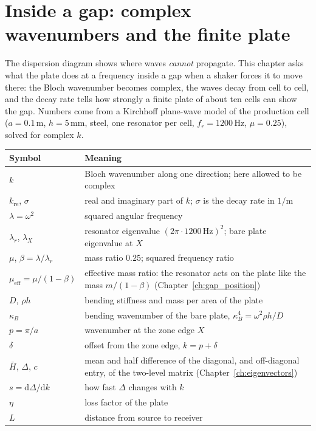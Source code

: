 
\chapter{Inside a gap: complex wavenumbers and the finite plate}
\label{ch:complex_k}

The dispersion diagram shows where waves \emph{cannot} propagate. This chapter asks
what the plate does at a frequency inside a gap when a shaker forces it to move
there: the Bloch wavenumber becomes complex, the waves decay from cell to cell, and
the decay rate tells how strongly a finite plate of about ten cells can show the
gap. Numbers come from a Kirchhoff plane-wave model of the production cell
($a = 0.1\,\mathrm{m}$, $h = 5\,\mathrm{mm}$, steel, one resonator per cell,
$f_r = 1200\,\mathrm{Hz}$, $\mu = 0.25$), solved for complex $k$.

\begin{center}
\begin{tabular}{|l|p{}|}
\hline
Symbol & Meaning \\
\hline
$k$ & Bloch wavenumber along one direction; here allowed to be complex \\
$k_\mathrm{re}$, $\sigma$ & real and imaginary part of $k$; $\sigma$ is the decay rate in $1/\mathrm{m}$ \\
$\lambda = \omega^2$ & squared angular frequency \\
$\lambda_r$, $\lambda_X$ & resonator eigenvalue $(2\pi\cdot 1200\,\mathrm{Hz})^2$; bare plate eigenvalue at $X$ \\
$\mu$, $\beta = \lambda/\lambda_r$ & mass ratio $0.25$; squared frequency ratio \\
$\mu_\mathrm{eff} = \mu/(1-\beta)$ & effective mass ratio: the resonator acts on the plate like the mass $m/(1-\beta)$ (Chapter~\ref{ch:gap_position}) \\
$D$, $\rho h$ & bending stiffness and mass per area of the plate \\
$\kappa_B$ & bending wavenumber of the bare plate, $\kappa_B^4 = \omega^2\rho h/D$ \\
$p = \pi/a$ & wavenumber at the zone edge $X$ \\
$\delta$ & offset from the zone edge, $k = p + \delta$ \\
$\bar{H}$, $\Delta$, $c$ & mean and half difference of the diagonal, and off-diagonal entry, of the two-level matrix (Chapter~\ref{ch:eigenvectors}) \\
$s = \mathrm{d}\Delta/\mathrm{d}k$ & how fast $\Delta$ changes with $k$ \\
$\eta$ & loss factor of the plate \\
$L$ & distance from source to receiver \\
\hline
\end{tabular}
\end{center}

